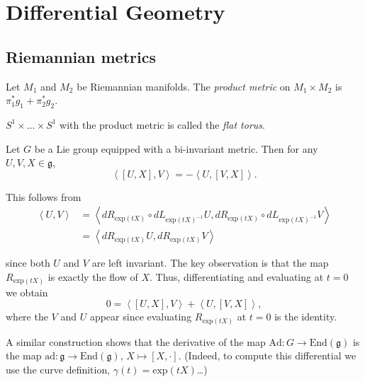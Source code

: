\documentclass{book}
\begin{document}
\tableofcontents

\chapter{Differential Geometry}
\label{chapter-differential-geometry}




\section{Riemannian metrics}
\label{section-Riemannian-metrics}

\begin{definition}
\label{definition-product-metric}
Let $M_1$ and $M_2$ be Riemannian manifolds.
The {\it product metric} on
$M_1\times M_2$ is $\pi_1^*g_1+\pi_2^*g_2$.
\end{definition}

\begin{definition}
\label{definition-flat-torus}
$S^1\times\ldots\times S^1$ with the product
metric is called the {\it flat
torus}.
\end{definition}

\medskip\noindent
Let $G$ be a Lie group equipped with a
bi-invariant metric.
Then for any $U,V,X \in \mathfrak{g}$,
\begin{equation}
\label{equation-lie-group-bi-invar-metri}
\left\langle{}[U,X],V\right\rangle{}=-\left\langle{}U,[V,X]\right\rangle{}.
\end{equation}

\noindent
This follows from
$$
\begin{aligned}
\left\langle{}U,V\right\rangle{}&=
\left\langle{}dR_{\text{exp}(tX)}\circ
dL_{\text{exp}(tX)^{-1}}U,
dR_{\text{exp}(tX)}\circ
dL_{\text{exp}(tX)^{-1}}V\right\rangle{}\\
&=\left\langle{}dR_{\text{exp}(tX)}U,
dR_{\text{exp}(tX)}V\right\rangle{}
\end{aligned}
$$

\noindent
since both $U$ and $V$ are left invariant.
The key observation is that the map
$R_{\text{exp}(tX)}$
is exactly the flow of $X$.
Thus, differentiating and evaluating at $t=0$
we obtain
$$
0=\left\langle{}[U,X],V\right\rangle{}+\left\langle{}U,[V,X]\right\rangle{},
$$
where the $V$ and $U$ appear since evaluating
$R_{\text{exp}(tX)}$ at $t=0$ is the
identity.

A similar construction shows that the
derivative of the map
$\text{Ad}:G \to \text{End}(\mathfrak{g})$
is the map $\text{ad}:\mathfrak{g} \to
\text{End}(\mathfrak{g})$,
$X \mapsto [X,\cdot]$.
(Indeed, to compute this differential we use
the curve definition,
$\gamma(t)=\text{exp}(tX)$…)
\end{document}
